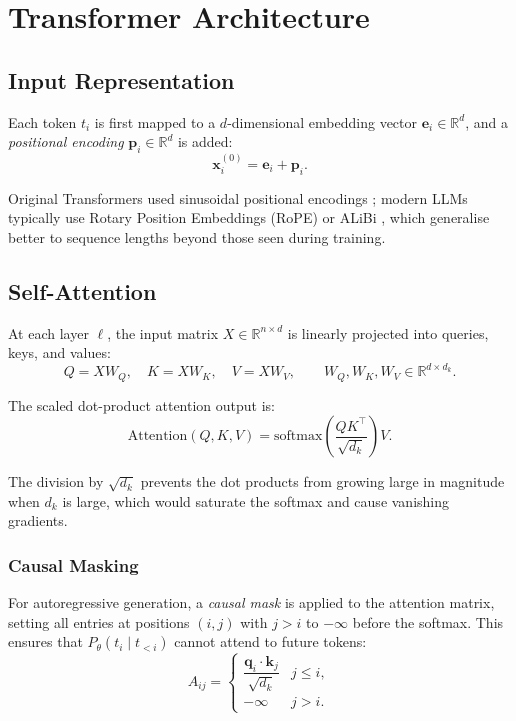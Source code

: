 \documentclass[11pt,a4paper]{article}
\theoremstyle{definition}
\theoremstyle{plain}
\newcommand{\R}{\mathbb{R}}
\begin{document}
\section{Transformer Architecture}

\subsection{Input Representation}

Each token $t_i$ is first mapped to a $d$-dimensional embedding vector $\mathbf{e}_i \in \R^d$,
and a \emph{positional encoding} $\mathbf{p}_i \in \R^d$ is added:
\[
  \mathbf{x}_i^{(0)} = \mathbf{e}_i + \mathbf{p}_i.
\]

Original Transformers used sinusoidal positional encodings \cite{vaswani2017attention};
modern LLMs typically use Rotary Position Embeddings (RoPE) \cite{su2024rope}
or ALiBi \cite{press2022alibi}, which generalise better to sequence lengths
beyond those seen during training.

\subsection{Self-Attention}

At each layer $\ell$, the input matrix $X \in \R^{n \times d}$ is linearly
projected into queries, keys, and values:
\[
  Q = X W_Q, \quad K = X W_K, \quad V = X W_V,
  \qquad W_Q, W_K, W_V \in \R^{d \times d_k}.
\]

The scaled dot-product attention output is:
\[
  \mathrm{Attention}(Q, K, V)
  = \mathrm{softmax}\!\left(\frac{QK^\top}{\sqrt{d_k}}\right)V.
\]

The division by $\sqrt{d_k}$ prevents the dot products from growing large in
magnitude when $d_k$ is large, which would saturate the softmax and cause
vanishing gradients.

\subsubsection{Causal Masking}

For autoregressive generation, a \emph{causal mask} is applied to the attention
matrix, setting all entries at positions $(i, j)$ with $j > i$ to $-\infty$
before the softmax.
This ensures that $P_\theta(t_i \mid t_{<i})$ cannot attend to future tokens:
\[
  A_{ij} = \begin{cases}
    \dfrac{\mathbf{q}_i \cdot \mathbf{k}_j}{\sqrt{d_k}} & j \leq i, \\[6pt]
    -\infty & j > i.
  \end{cases}
\]
\end{document}
